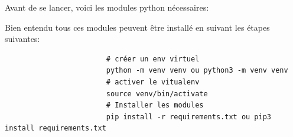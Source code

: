\documentclass[a4paper,11pt]{article}
\begin{document}
            \noindent Avant de se lancer, voici les modules python nécessaires:
                
            \noindent Bien entendu tous ces modules peuvent être installé en suivant les étapes suivantes:
                \begin{tcolorbox}[colback=lightgray!6, colframe=black, left=-40mm, right=5mm, top=2mm, bottom=-2mm, boxrule=0.1mm]
                    \begin{verbatim}
                        # créer un env virtuel
                        python -m venv venv ou python3 -m venv venv 
                        # activer le vitualenv
                        source venv/bin/activate 
                        # Installer les modules
                        pip install -r requirements.txt ou pip3 install requirements.txt
                    \end{verbatim}
                \end{tcolorbox}
\end{document}
